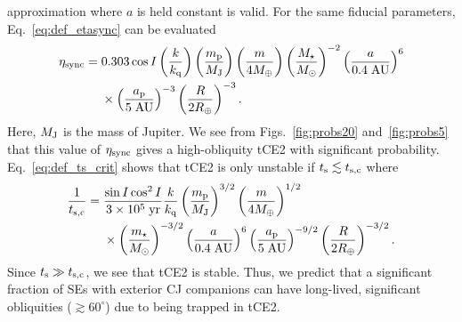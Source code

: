 \documentclass[
        fleqn,
        usenatbib,
    ]{mnras}
\newcommand*{\p}[1]{\left(#1\right)}
\begin{document}
approximation where $a$ is held constant is valid. For the same fiducial
parameters, Eq.~\eqref{eq:def_etasync} can be evaluated
\begin{align}
    \eta_{\rm sync} ={}& 0.303 \cos I
            \p{\frac{k}{k_{\rm q}}}
            \p{\frac{m_{\rm p}}{M_{\rm J}}}
            \p{\frac{m}{4M_{\oplus}}}
            \p{\frac{M_\star}{M_{\odot}}}^{-2}
            \p{\frac{a}{0.4\;\mathrm{AU}}}^{6}\nonumber\\
        &\times \p{\frac{a_{\rm p}}{5\;\mathrm{AU}}}^{-3}
            \p{\frac{R}{2R_{\oplus}}}^{-3}.\label{eq:sehj_etasync}
\end{align}
Here, $M_{\rm J}$ is the mass of Jupiter. We see from Figs.~\ref{fig:probs20}
and~\ref{fig:probs5} that this value of $\eta_{\rm sync}$ gives a high-obliquity
tCE2 with significant probability. Eq.~\eqref{eq:def_ts_crit} shows that tCE2 is
only unstable if $t_{\rm s} \lesssim t_{\rm s, c}$ where
\begin{align}
    \frac{1}{t_{\rm s, c}} ={}& \frac{\sin I \cos^2 I}{3 \times
        10^5\;\mathrm{yr}}
            \frac{k}{k_{\rm q}}
            \p{\frac{m_{\rm p}}{M_{\rm J}}}^{3/2}
            \p{\frac{m}{4 M_{\oplus}}}^{1/2}\nonumber\\
        &\times \p{\frac{m_\star}{M_{\odot}}}^{-3/2}
            \p{\frac{a}{0.4\;\mathrm{AU}}}^6
            \p{\frac{a_{\rm p}}{5\;\mathrm{AU}}}^{-9/2}
            \p{\frac{R}{2 R_{\oplus}}}^{-3/2}.
\end{align}
Since $t_{\rm s} \gg t_{\rm s, c}$, we see that tCE2 is stable. Thus, we predict
that a significant fraction of SEs with exterior CJ companions can have
long-lived, significant obliquities ($\gtrsim 60^\circ$) due to being trapped in
tCE2.

\end{document}
